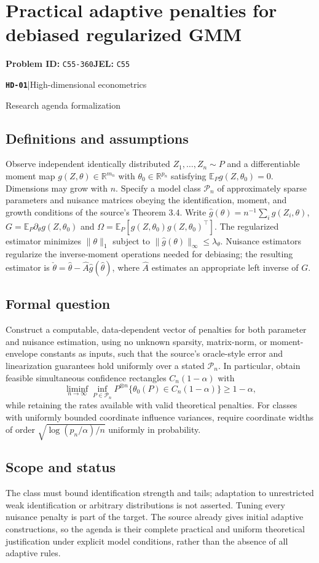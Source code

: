 \documentclass[11pt,a4paper]{article}
\newcommand{\R}{\mathbb R}
\newcommand{\E}{\mathbb E}
\newcommand{\entrymeta}[3]{{\sffamily\small\color{muted}\textbf{\texttt{#1}}\quad|\quad #2\par #3\par}}
\begin{document}
\section*{Practical adaptive penalties for debiased regularized GMM}
\textbf{Problem ID:} \texttt{C55-360}\quad \textbf{JEL:} \texttt{C55}\par
\label{problem:OP-0577}
\label{beyond:HD-01}
\entrymeta{HD-01}{High-dimensional econometrics}{Research agenda formalization}
\subsection*{Definitions and assumptions}
Observe independent identically distributed $Z_1,\ldots,Z_n\sim P$ and
a differentiable moment map $g(Z,\theta)\in\R^{m_n}$ with
$\theta_0\in\R^{p_n}$ satisfying $\E_Pg(Z,\theta_0)=0$.
Dimensions may grow with $n$. Specify a model class $\mathcal P_n$ of
approximately sparse parameters and nuisance matrices obeying the
identification, moment, and growth conditions of the source's
Theorem 3.4. Write
$\widehat g(\theta)=n^{-1}\sum_i g(Z_i,\theta)$,
$G=\E_P\partial_\theta g(Z,\theta_0)$ and
$\Omega=\E_P[g(Z,\theta_0)g(Z,\theta_0)^\top]$.
The regularized estimator minimizes $\|\theta\|_1$ subject to
$\|\widehat g(\theta)\|_\infty\leq\lambda_\theta$.
Nuisance estimators regularize the inverse-moment operations needed
for debiasing; the resulting estimator is
$\check\theta=\widehat\theta-\widehat A\widehat g(\widehat\theta)$,
where $\widehat A$ estimates an appropriate left inverse of $G$.
\subsection*{Formal question}
Construct a computable, data-dependent vector of penalties for both
parameter and nuisance estimation, using no unknown sparsity,
matrix-norm, or moment-envelope constants as inputs, such that the
source's oracle-style error and linearization guarantees hold uniformly
over a stated $\mathcal P_n$. In particular, obtain feasible simultaneous
confidence rectangles $C_n(1-\alpha)$ with
\[
 \liminf_{n\to\infty}\inf_{P\in\mathcal P_n}
 P^{\otimes n}\{\theta_0(P)\in C_n(1-\alpha)\}\geq1-\alpha,
\]
while retaining the rates available with valid theoretical penalties.
For classes with uniformly bounded coordinate influence variances,
require coordinate widths of order
$\sqrt{\log(p_n/\alpha)/n}$ uniformly in probability.
\subsection*{Scope and status}
The class must bound identification strength and tails; adaptation to
unrestricted weak identification or arbitrary distributions is not
asserted. Tuning every nuisance penalty is part of the target. The
source already gives initial adaptive constructions, so the agenda is
their complete practical and uniform theoretical justification under
explicit model conditions, rather than the absence of all adaptive rules.
\end{document}
